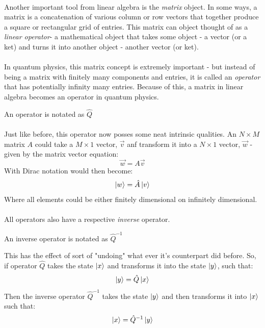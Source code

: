 \documentclass[12pt,letterpaper]{book}
\begin{document}
\paragraph*{}Another important tool from linear algebra is the \textit{matrix} object. In some ways, a matrix is a concatenation of various column or row vectors that together produce a square or rectangular grid of entries. This matrix can object thought of as a \textit{linear operator}- a mathematical object that takes some object - a vector (or a ket) and turns it into another object - another vector (or ket).
\paragraph*{}In quantum physics, this matrix concept is extremely important - but instead of being a matrix with finitely many components and entries, it is called an \textit{operator} that has potentially infinity many entries. Because of this, a matrix in linear algebra becomes an operator in quantum physics.
\begin{center}
An operator is notated as $\hat{Q}$
\end{center}
\paragraph*{}Just like before, this operator now posses some neat intrinsic qualities. An $N \times M$ matrix $A$ could take a $M \times 1$ vector, $\vec{v}$ anf transform it into a $N \times 1$ vector, $\vec{w}$ - given by the matrix vector equation:
\begin{equation}
\label{mat-vec}
\vec{w} =  A\vec{v}
\end{equation}
With Dirac notation would then become:
\begin{equation}
\label{op-ket}
\ket{w} = \hat{A}\ket{v}
\end{equation}
Where all elements could be either finitely dimensional on infinitely dimensional.
\paragraph*{}All operators also have a respective \textit{inverse} operator.
\begin{center}
An inverse operator is notated as $\hat{Q}^{-1}$
\end{center}
This has the effect of sort of "undoing" what ever it's counterpart did before. So, if operator $\hat{Q}$ takes the state $\ket{x}$ and transforms it into the state $\ket{y}$, such that:
\begin{equation}
\ket{y} = \hat{Q}\ket{x}
\end{equation}
Then the inverse operator $\hat{Q}^{-1}$ takes the state $\ket{y}$ and then transforms it into $\ket{x}$ such that:
\begin{equation}
\ket{x} = \hat{Q}^{-1}\ket{y}
\end{equation}
\end{document}
